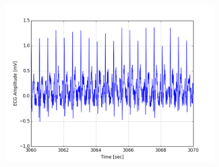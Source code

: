 \documentclass[paper=a4, fontsize=11pt]{scrartcl}
\numberwithin{equation}{section}		%
\numberwithin{figure}{section}			%
\numberwithin{table}{section}		    %
\begin{document}
\begin{appendices}
\begin{figure}[H]
\begin{subfigure}[b]{0.3\textwidth}
		\includegraphics[width=\textwidth]{sim/ecg_60}
	\end{subfigure}
\end{figure}


\end{appendices}
\end{document}
